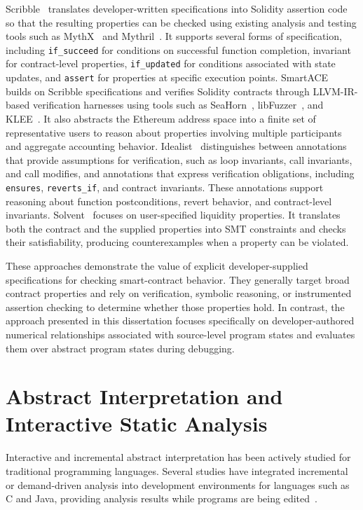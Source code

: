 \documentclass[11pt,oneside]{report}
\theoremstyle{plain}
\theoremstyle{definition}
\theoremstyle{remark}
\begin{document}
Scribble~\citep{scribble} translates developer-written specifications into Solidity assertion code so that the resulting properties can be checked using existing analysis and testing tools such as MythX~\citep{mythx} and Mythril~\citep{mythril}.
It supports several forms of specification, including \texttt{if\_succeed} for conditions on successful function completion, invariant for contract-level properties, \texttt{if\_updated} for conditions associated with state updates, and \texttt{assert} for properties at specific execution points.
SmartACE~\citep{smartace} builds on Scribble specifications and verifies Solidity contracts through LLVM-IR-based verification harnesses using tools such as SeaHorn~\citep{seahorn}, libFuzzer~\citep{libfuzzer}, and KLEE~\citep{klee}.
It also abstracts the Ethereum address space into a finite set of representative users to reason about properties involving multiple participants and aggregate accounting behavior.
Idealist~\citep{idealist} distinguishes between annotations that provide assumptions for verification, such as loop invariants, call invariants, and call modifies, and annotations that express verification obligations, including \texttt{ensures}, \texttt{reverts\_if}, and contract invariants.
These annotations support reasoning about function postconditions, revert behavior, and contract-level invariants.
Solvent~\citep{solvent} focuses on user-specified liquidity properties.
It translates both the contract and the supplied properties into SMT constraints and checks their satisfiability, producing counterexamples when a property can be violated.

These approaches demonstrate the value of explicit developer-supplied specifications for checking smart-contract behavior.
They generally target broad contract properties and rely on verification, symbolic reasoning, or instrumented assertion checking to determine whether those properties hold.
In contrast, the approach presented in this dissertation focuses specifically on developer-authored numerical relationships associated with source-level program states and evaluates them over abstract program states during debugging.

\section{Abstract Interpretation and Interactive Static Analysis}
\label{sec:rel:ai}
Interactive and incremental abstract interpretation has been actively studied for traditional programming languages.
Several studies have integrated incremental or demand-driven analysis into development environments for languages such as C and Java, providing analysis results while programs are being edited~\citep{daig,ds,iac,iaj,fap}.
\end{document}
